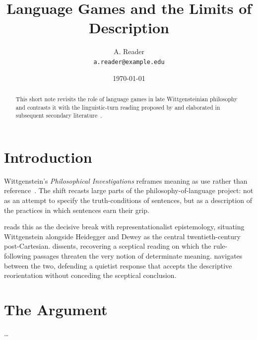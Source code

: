 \documentclass[11pt,a4paper]{article}
\title{Language Games and the Limits of Description}
\author{A. Reader \\ \texttt{a.reader@example.edu}}
\date{\today}
\begin{document}
\maketitle

\begin{abstract}
This short note revisits the role of language games
in late Wittgensteinian philosophy~\parencite{wittgenstein1953}
and contrasts it with the linguistic-turn reading proposed by
\textcite{rorty1979} and elaborated in subsequent secondary
literature~\parencite{kripke1982,mcdowell1994}.
\end{abstract}

\section{Introduction}

Wittgenstein's \emph{Philosophical Investigations} reframes meaning
as use rather than reference~\parencite{wittgenstein1953}. The shift
recasts large parts of the philosophy-of-language project: not as
an attempt to specify the truth-conditions of sentences, but as a
description of the practices in which sentences earn their grip.

\textcite{rorty1979} reads this as the decisive break with
representationalist epistemology, situating Wittgenstein alongside
Heidegger and Dewey as the central twentieth-century post-Cartesian.
\textcite{kripke1982} dissents, recovering a sceptical reading on
which the rule-following passages threaten the very notion of
determinate meaning. \textcite{mcdowell1994} navigates between the
two, defending a quietist response that accepts the descriptive
reorientation without conceding the sceptical conclusion.

\section{The Argument}

\dots

\printbibliography
\end{document}

